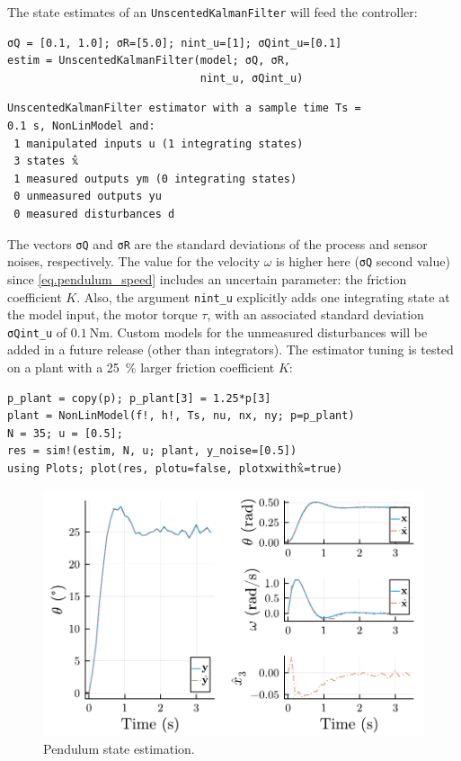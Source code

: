 The state estimates of an \texttt{UnscentedKalmanFilter} will feed the controller:
\begin{verbatim}
σQ = [0.1, 1.0]; σR=[5.0]; nint_u=[1]; σQint_u=[0.1]
estim = UnscentedKalmanFilter(model; σQ, σR, 
                              nint_u, σQint_u)
\end{verbatim}
\spacerepl
\begin{verbatim}
UnscentedKalmanFilter estimator with a sample time Ts =
0.1 s, NonLinModel and:
 1 manipulated inputs u (1 integrating states)
 3 states 𝕩̂
 1 measured outputs ym (0 integrating states)
 0 unmeasured outputs yu
 0 measured disturbances d
\end{verbatim}
The vectors \texttt{σQ} and \texttt{σR} are the standard deviations of the process and sensor noises, respectively. The value for the velocity $\omega$ is higher here (\texttt{σQ} second value) since \eqref{eq.pendulum_speed} includes an uncertain parameter: the friction coefficient $K$. Also, the argument \texttt{nint\_u} explicitly adds one integrating state at the model input, the motor torque $\tau$, with an associated standard deviation \texttt{σQint\_u} of $\SI{0.1}{\newton\meter}$. Custom models for the unmeasured disturbances will be added in a future release (other than integrators). The estimator tuning is tested on a plant with a \SI{25}{\percent} larger friction coefficient $K$: 
\begin{verbatim}
p_plant = copy(p); p_plant[3] = 1.25*p[3]
plant = NonLinModel(f!, h!, Ts, nu, nx, ny; p=p_plant)
N = 35; u = [0.5]; 
res = sim!(estim, N, u; plant, y_noise=[0.5])
using Plots; plot(res, plotu=false, plotxwith𝕩̂=true)
\end{verbatim}

\begin{figure}[h]
    \centering
    \includegraphics[width=\columnwidth]{fig/plot_NonLinMPC1.pdf}
    \caption{Pendulum state estimation.}\label{fig:plot_NonLinMPC1}
\end{figure}

